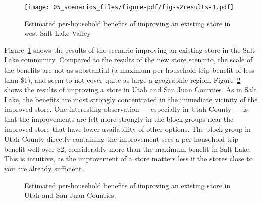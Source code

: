 \documentclass[
  letterpaper,
  authoryear,
  review,
  3p]{elsarticle}
\begin{document}
\begin{figure}

{\centering \texttt{[image: 05\_scenarios\_files/figure-pdf/fig-s2results-1.pdf]}

}

\caption{\label{fig-s2results}Estimated per-household benefits of
improving an existing store in west Salt Lake Valley}

\end{figure}

Figure~\ref{fig-s2results} shows the results of the scenario improving
an existing store in the Salt Lake community. Compared to the results of
the new store scenario, the scale of the benefits are not as substantial
(a maximum per-household-trip benefit of less than \$1), and seem to not
cover quite as large a geographic region. Figure~\ref{fig-s2sjut} shows
the results of improving a store in Utah and San Juan Counties. As in
Salt Lake, the benefits are most strongly concentrated in the immediate
vicinity of the improved store. One interesting observation ---
especially in Utah County --- is that the improvements are felt more
strongly in the block groups near the improved store that have lower
availability of other options. The block group in Utah County directly
containing the improvement sees a per-household-trip benefit well over
\$2, considerably more than the maximum benefit in Salt Lake. This is
intuitive, as the improvement of a store matters less if the stores
close to you are already sufficient.

\begin{figure}

\begin{minipage}[t]{0.50\linewidth}

{\centering 


}

\end{minipage}%
%
\begin{minipage}[t]{0.50\linewidth}

{\centering 


}

\end{minipage}%

\caption{\label{fig-s2sjut}Estimated per-household benefits of improving
an existing store in Utah and San Juan Counties.}

\end{figure}
\end{document}
